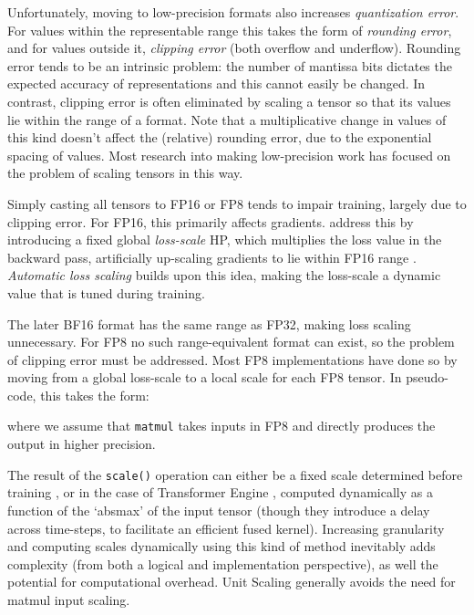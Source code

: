 Unfortunately, moving to low-precision formats also increases \textit{quantization error}. For values within the representable range this takes the form of \textit{rounding error}, and for values outside it, \textit{clipping error} (both overflow and underflow). Rounding error tends to be an intrinsic problem: the number of mantissa bits dictates the expected accuracy of representations and this cannot easily be changed. In contrast, clipping error is often eliminated by scaling a tensor so that its values lie within the range of a format. Note that a multiplicative change in values of this kind doesn't affect the (relative) rounding error, due to the exponential spacing of values. Most research into making low-precision work has focused on the problem of scaling tensors in this way.

Simply casting all tensors to FP16 or FP8 tends to impair training, largely due to clipping error. For FP16, this primarily affects gradients. \citep{Mixed_Precision} address this by introducing a fixed global \textit{loss-scale} HP, which multiplies the loss value in the backward pass, artificially up-scaling gradients to lie within FP16 range \citep{Mixed_Precision}. \textit{Automatic loss scaling} \citep{OpenSeq2Seq} builds upon this idea, making the loss-scale a dynamic value that is tuned during training.

The later BF16 format has the same range as FP32, making loss scaling unnecessary. For FP8 no such range-equivalent format can exist, so the problem of clipping error must be addressed. Most FP8 implementations have done so by moving from a global loss-scale to a local scale for each FP8 tensor. In pseudo-code, this takes the form:


where we assume that \texttt{matmul} takes inputs in FP8 and directly produces the output in higher precision.

The result of the \texttt{scale()} operation can either be a fixed scale determined before training \citep{8_Bit_Numerical_Formats}, or in the case of Transformer Engine \citep{FP8_Transformer_Engine}, computed dynamically as a function of the `absmax' of the input tensor (though they introduce a delay across time-steps, to facilitate an efficient fused kernel). Increasing granularity and computing scales dynamically using this kind of method inevitably adds complexity (from both a logical and implementation perspective), as well the potential for computational overhead. Unit Scaling generally avoids the need for matmul input scaling.